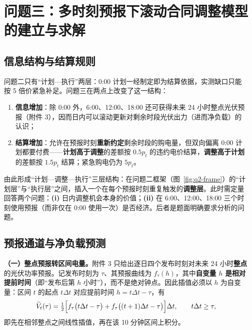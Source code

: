 
\section{问题三：多时刻预报下滚动合同调整模型的建立与求解}

\subsection{信息结构与结算规则}
\label{sec:q3-frame}

问题二只有``计划—执行''两层：0:00 计划一经制定即为结算依据，实测缺口只能按 5 倍价紧急补足。问题三在两点上改变了这一结构：

\begin{enumerate}
  \item \textbf{信息增加}：除 0:00 外，6:00、12:00、18:00 还可获得未来 24 小时整点光伏预报（附件 3），因而日内可以滚动更新对剩余时段光伏出力（进而净负载）的认识；
  \item \textbf{结算增加}：允许在预报时刻\textbf{重新约定}剩余时段的购电量，但双向偏离 0:00 计划都要付费——\textbf{计划高于调整}的差额按 $0.5p_t$ 的违约电价结算，\textbf{调整高于计划}的差额按 $1.5p_t$ 结算；紧急购电仍为 $5p_t$。
\end{enumerate}

由此形成``计划—调整—执行''三层结构：在问题二框架（图~\ref{fig:q2-frame}）的``计划层''与``执行层''之间，插入一个在每个预报时刻重复触发的\textbf{调整层}。此时需定量回答两个问题：\textbf{(i)} 日内调整机会本身的价值；\textbf{(ii)} 在 6:00、12:00、18:00 三个时刻使用预报（而非仅在 0:00 使用一次）是否经济。后者是题面明确要求分析的问题。

\subsection{预报通道与净负载预测}
\label{sec:q3-forecast}

\textbf{（一）整点预报转区间电量。}附件 3 只给出逐日四个发布时刻对未来 24 小时\textbf{整点}的光伏功率预报。记发布时刻为 $\tau$、其预报曲线为 $f_\tau(h)$，其中\textbf{自变量 $h$ 是相对提前时间}（即``发布后第 $h$ 小时''），而不是绝对钟点。因此插值必须以 $h$ 为自变量：区间 $t$ 的起点 $t\Delta t$ 对应提前时间 $h=t\Delta t-\tau$，有
\begin{equation}
  \widetilde V_t(\tau)=\tfrac12\Bigl[f_\tau\bigl(t\Delta t-\tau\bigr)+f_\tau\bigl((t+1)\Delta t-\tau\bigr)\Bigr]\Delta t ,
  \qquad t\Delta t\ge\tau ,
  \label{eq:q3-pv}
\end{equation}
即先在相邻整点之间线性插值，再在该 10 分钟区间上积分。

